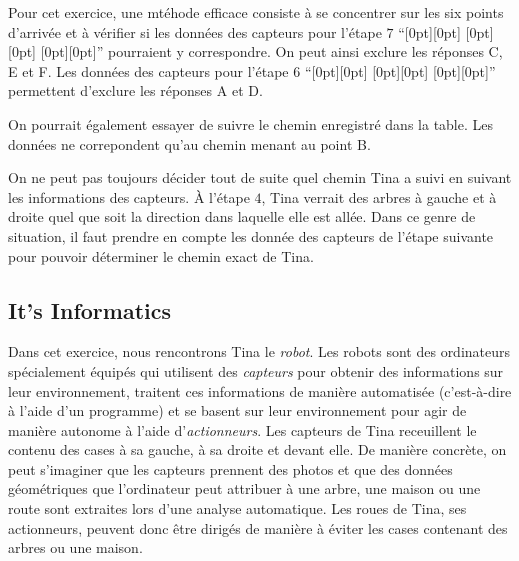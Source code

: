 \documentclass[a4paper,11pt]{report}
\newcommand{\taskGraphicsFolder}{..}
\begin{document}
Pour cet exercice, une mtéhode efficace consiste à se concentrer sur les six points d’arrivée et à vérifier si les données des capteurs pour l’étape $7$ “\raisebox{-0.5ex}[0pt][0pt]{} \raisebox{-0.5ex}[0pt][0pt]{} \raisebox{-0.5ex}[0pt][0pt]{}” pourraient y correspondre. On peut ainsi exclure les réponses C, E et F. Les données des capteurs pour l’étape $6$ “\raisebox{-0.5ex}[0pt][0pt]{} \raisebox{-0.5ex}[0pt][0pt]{} \raisebox{-0.5ex}[0pt][0pt]{}” permettent d’exclure les réponses A et D.

On pourrait également essayer de suivre le chemin enregistré dans la table. Les données ne correpondent qu’au chemin menant au point B.

On ne peut pas toujours décider tout de suite quel chemin Tina a suivi en suivant les informations des capteurs. À l’étape $4$, Tina verrait des arbres à gauche et à droite quel que soit la direction dans laquelle elle est allée. Dans ce genre de situation, il faut prendre en compte les donnée des capteurs de l’étape suivante pour pouvoir déterminer le chemin exact de Tina.

{\centering%
\par}


\subsection*{It’s Informatics}

Dans cet exercice, nous rencontrons Tina le \emph{robot}. Les robots sont des ordinateurs spécialement équipés qui utilisent des \emph{capteurs} pour obtenir des informations sur leur environnement, traitent ces informations de manière automatisée (c’est-à-dire à l’aide d’un programme) et se basent sur leur environnement pour agir de manière autonome à l’aide d’\emph{actionneurs}.
Les capteurs de Tina receuillent le contenu des cases à sa gauche, à sa droite et devant elle. De manière concrète, on peut s’imaginer que les capteurs prennent des photos et que des données géométriques que l’ordinateur peut attribuer à une arbre, une maison ou une route sont extraites lors d’une analyse automatique.  Les roues de Tina, ses actionneurs, peuvent donc être dirigés de manière à éviter les cases contenant des arbres ou une maison.
\end{document}
